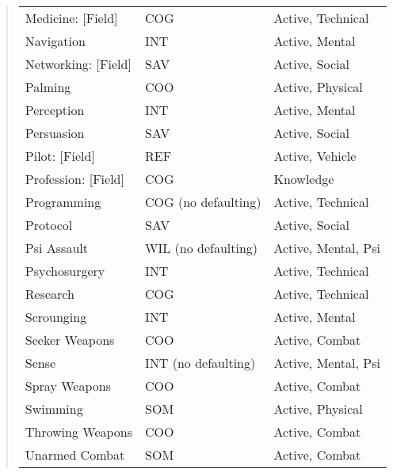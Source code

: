 \begin{quotation}
\begin{tabular}{lll}
Medicine: [Field] & COG & Active, Technical\\
Navigation & INT & Active, Mental\\
Networking: [Field] & SAV & Active, Social\\
Palming & COO & Active, Physical\\
Perception & INT & Active, Mental\\
Persuasion & SAV & Active, Social\\
Pilot: [Field] & REF & Active, Vehicle\\
Profession: [Field] & COG & Knowledge\\
Programming & COG (no defaulting) & Active, Technical\\
Protocol & SAV & Active, Social\\
Psi Assault & WIL (no defaulting) & Active, Mental, Psi\\
Psychosurgery & INT & Active, Technical\\
Research & COG & Active, Technical\\
Scrounging & INT & Active, Mental\\
Seeker Weapons & COO & Active, Combat\\
Sense & INT (no defaulting) & Active, Mental, Psi\\
Spray Weapons & COO & Active, Combat\\
Swimming & SOM & Active, Physical\\
Throwing Weapons & COO & Active, Combat\\
Unarmed Combat & SOM & Active, Combat\\
\end{tabular}
\end{quotation}

